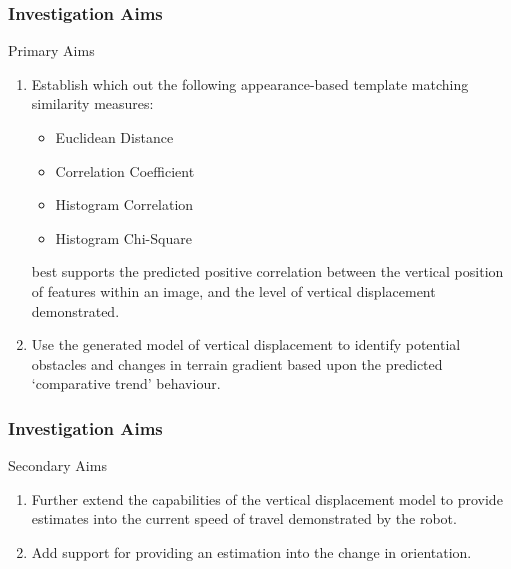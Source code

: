 \documentclass[10pt, compress]{beamer}
\begin{document}
\begin{frame}[fragile]
  \frametitle{Investigation Aims}

  \begin{block}{Primary Aims}
  
  	  \begin{enumerate}[label={\arabic*.}]
  \item Establish which out the following appearance-based template matching similarity measures:
 {\small \begin{itemize}[label={\textbullet}]
  	\item Euclidean Distance
  	\item Correlation Coefficient
  	\item Histogram Correlation
  	\item Histogram Chi-Square
  \end{itemize} }
  
  best supports the predicted positive correlation between the vertical position of features within an image, and the level of vertical displacement demonstrated.
 
  \item Use the generated model of vertical displacement to identify potential obstacles and changes in terrain gradient based upon the predicted ‘comparative trend’ behaviour.
\end{enumerate}

  \end{block}

\end{frame}

\begin{frame}[fragile]
  \frametitle{Investigation Aims}

  \begin{block}{Secondary Aims}
  
  	  \begin{enumerate}[label={\arabic*.}]
  	  
  \item Further extend the capabilities of the vertical displacement model to provide estimates into the current speed of travel demonstrated by the robot.

  \item Add support for providing an estimation into the change in orientation.
 
\end{enumerate}

  \end{block}

\end{frame}
\end{document}
